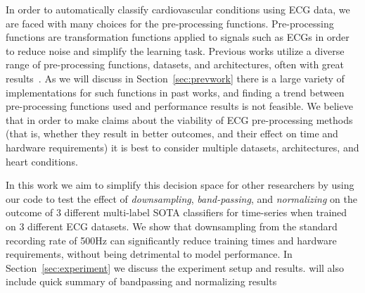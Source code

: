 \documentclass[pmlr,twocolumn]{jmlr}%
\begin{document}
In order to automatically classify cardiovascular conditions using ECG data, we are faced with many choices for the pre-processing functions. Pre-processing functions are transformation functions applied to signals such as ECGs in order to reduce noise and simplify the learning task. Previous works utilize a diverse range of pre-processing functions, datasets, and architectures, often with great results~\cite{hong2022practical}. As we will discuss in Section~\ref{sec:prevwork} there is a large variety of implementations for such functions in past works, and finding a trend between pre-processing functions used and performance results is not feasible. We believe that in order to make claims about the viability of ECG pre-processing methods (that is, whether they result in better outcomes, and their effect on time and hardware requirements) it is best to consider multiple datasets, architectures, and heart conditions.  


In this work we aim to simplify this decision space for other researchers by using our code to test the effect of \textit{downsampling}, \textit{band-passing}, and \textit{normalizing} on the outcome of 3 different multi-label SOTA classifiers for time-series when trained on 3 different ECG datasets. We show that downsampling from the standard recording rate of 500Hz can significantly reduce training times and hardware requirements, without being detrimental to model performance. In Section~\ref{sec:experiment} we discuss the experiment setup and results.  {\color{red} will also include quick summary of bandpassing and normalizing results}\\



\begin{table}[tbp]
\label{tab:top5}
{\caption{Top 5 teams in Physionet2020 and pre-processing functions used.}}%
    
    { 
}
\end{table}
\end{document}
